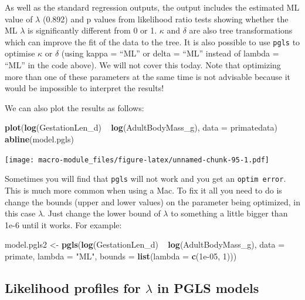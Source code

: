 \documentclass[]{book}
\newenvironment{Shaded}{\begin{snugshade}}{\end{snugshade}}
\newcommand{\KeywordTok}[1]{\textcolor[rgb]{0.13,0.29,0.53}{\textbf{{#1}}}}
\newcommand{\DataTypeTok}[1]{\textcolor[rgb]{0.13,0.29,0.53}{{#1}}}
\newcommand{\DecValTok}[1]{\textcolor[rgb]{0.00,0.00,0.81}{{#1}}}
\newcommand{\FloatTok}[1]{\textcolor[rgb]{0.00,0.00,0.81}{{#1}}}
\newcommand{\StringTok}[1]{\textcolor[rgb]{0.31,0.60,0.02}{{#1}}}
\newcommand{\NormalTok}[1]{{#1}}
\begin{document}
As well as the standard regression outputs, the output includes the
estimated ML value of \(\lambda\) (0.892) and p values from likelihood
ratio tests showing whether the ML \(\lambda\) is significantly
different from 0 or 1. \(\kappa\) and \(\delta\) are also tree
transformations which can improve the fit of the data to the tree. It is
also possible to use \texttt{pgls} to optimise \(\kappa\) or \(\delta\)
(using kappa = ``ML'' or delta = ``ML'' instead of lambda = ``ML'' in
the code above). We will not cover this today. Note that optimizing more
than one of these parameters at the same time is not advisable because
it would be impossible to interpret the results!

We can also plot the results as follows:

\begin{Shaded}
\begin{Highlighting}[]
\KeywordTok{plot}\NormalTok{(}\KeywordTok{log}\NormalTok{(GestationLen_d) ~}\StringTok{ }\KeywordTok{log}\NormalTok{(AdultBodyMass_g), }\DataTypeTok{data =} \NormalTok{primatedata)}
\KeywordTok{abline}\NormalTok{(model.pgls)}
\end{Highlighting}
\end{Shaded}

\texttt{[image: macro-module\_files/figure-latex/unnamed-chunk-95-1.pdf]}

Sometimes you will find that \texttt{pgls} will not work and you get an
\texttt{optim\ error}. This is much more common when using a Mac. To fix
it all you need to do is change the bounds (upper and lower values) on
the parameter being optimized, in this case \(\lambda\). Just change the
lower bound of \(\lambda\) to something a little bigger than 1e-6 until
it works. For example:

\begin{Shaded}
\begin{Highlighting}[]
\NormalTok{model.pgls2 <-}\StringTok{ }\KeywordTok{pgls}\NormalTok{(}\KeywordTok{log}\NormalTok{(GestationLen_d) ~}\StringTok{ }\KeywordTok{log}\NormalTok{(AdultBodyMass_g), }\DataTypeTok{data =} \NormalTok{primate,}
                    \DataTypeTok{lambda =} \StringTok{"ML"}\NormalTok{, }\DataTypeTok{bounds =} \KeywordTok{list}\NormalTok{(}\DataTypeTok{lambda =} \KeywordTok{c}\NormalTok{(}\FloatTok{1e-05}\NormalTok{, }\DecValTok{1}\NormalTok{)))}
\end{Highlighting}
\end{Shaded}

\subsection{\texorpdfstring{Likelihood profiles for \(\lambda\) in PGLS
models}{Likelihood profiles for \textbackslash{}lambda in PGLS models}}\label{likelihood-profiles-for-lambda-in-pgls-models}
\end{document}
